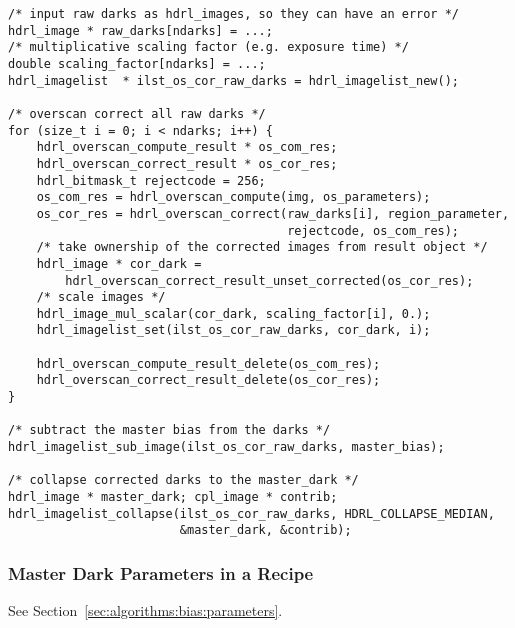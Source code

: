 \begin{lstlisting}
/* input raw darks as hdrl_images, so they can have an error */
hdrl_image * raw_darks[ndarks] = ...;
/* multiplicative scaling factor (e.g. exposure time) */
double scaling_factor[ndarks] = ...;
hdrl_imagelist  * ilst_os_cor_raw_darks = hdrl_imagelist_new();

/* overscan correct all raw darks */
for (size_t i = 0; i < ndarks; i++) {
    hdrl_overscan_compute_result * os_com_res;
    hdrl_overscan_correct_result * os_cor_res;
    hdrl_bitmask_t rejectcode = 256;
    os_com_res = hdrl_overscan_compute(img, os_parameters);
    os_cor_res = hdrl_overscan_correct(raw_darks[i], region_parameter,
                                       rejectcode, os_com_res);
    /* take ownership of the corrected images from result object */
    hdrl_image * cor_dark =
        hdrl_overscan_correct_result_unset_corrected(os_cor_res);
    /* scale images */
    hdrl_image_mul_scalar(cor_dark, scaling_factor[i], 0.);
    hdrl_imagelist_set(ilst_os_cor_raw_darks, cor_dark, i);

    hdrl_overscan_compute_result_delete(os_com_res);
    hdrl_overscan_correct_result_delete(os_cor_res);
}

/* subtract the master bias from the darks */
hdrl_imagelist_sub_image(ilst_os_cor_raw_darks, master_bias);

/* collapse corrected darks to the master_dark */
hdrl_image * master_dark; cpl_image * contrib;
hdrl_imagelist_collapse(ilst_os_cor_raw_darks, HDRL_COLLAPSE_MEDIAN,
                        &master_dark, &contrib);

\end{lstlisting}

\subsubsection{Master Dark Parameters in a Recipe}
See Section~\ref{sec:algorithms:bias:parameters}.
